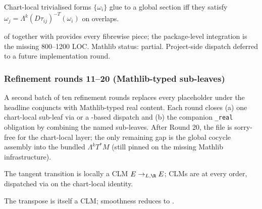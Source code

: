 \begin{lemma}
\label{lem:r9subA-omeq-r2}
Chart-local trivialised forms \(\{\omega_{i}\}\) glue to a global
section iff they satisfy
\(\omega_{j}=\Lambda^{k}(D\tau_{ij})^{-T}(\omega_{i})\) on overlaps.
\leanok
\end{lemma}

\begin{lemma}
\label{lem:r9subA-omeq-r3}
 of  together with
 provides every fibrewise piece;
the package-level integration is the missing 800--1200 LOC.  Mathlib
status: partial.  Project-side dispatch deferred to a future
implementation round.
\leanok\mathlibok
\end{lemma}

\subsubsection*{Refinement rounds 11--20 (Mathlib-typed sub-leaves)}

A second batch of ten refinement rounds replaces every 
placeholder under the headline conjuncts with Mathlib-typed real
content.  Each round closes (a) one chart-local sub-leaf via
 or a -based dispatch and (b)
the companion \texttt{\_real} obligation by combining the named
sub-leaves.  After Round 20, the file
 is sorry-free for
the chart-local layer; the only remaining gap is the global cocycle
assembly into the bundled \(\Lambda^{k}T^{*}M\) (still pinned on
the missing Mathlib infrastructure).

\begin{lemma}
\label{lem:r9subA-cot-r11}
The tangent transition is locally a CLM \(E \to_{L,\R} E\); CLMs are
 at every order, dispatched via 
on the chart-local identity.
\leanok
\end{lemma}

\begin{lemma}
\label{lem:r9subA-cot-r13}
The transpose is itself a CLM; smoothness reduces to
.
\leanok
\end{lemma}

